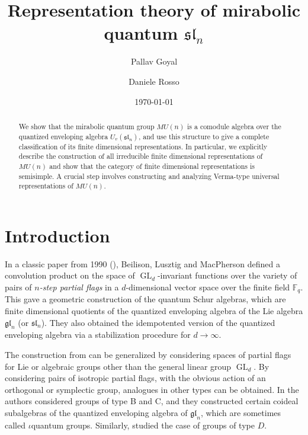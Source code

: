 \documentclass{amsart}
\title{Representation theory of mirabolic quantum $\mathfrak{sl}_n$}
\author{Pallav Goyal}
\author{Daniele Rosso}
\date{\today}
\numberwithin{equation}{section}
\theoremstyle{theorem}
\theoremstyle{definition}
\newcommand{\FF}{\mathbb{F}}
\newcommand{\gl}{\mathfrak{gl}}
\newcommand{\sll}{\mathfrak{sl}}
\newcommand{\GL}{\operatorname{GL}}
\begin{document}
\begin{abstract}
We show that the mirabolic quantum group $MU(n)$ is a comodule algebra over the quantized enveloping algebra $U_v(\mathfrak{sl}_n)$, and use this structure to give a complete classification of its finite dimensional representations. In particular, we explicitly describe the construction of all irreducible finite dimensional representations of $MU(n)$ and show that the category of finite dimensional representations is semisimple. A crucial step involves constructing and analyzing Verma-type universal representations of $MU(n)$.
\end{abstract}

\maketitle

\section{Introduction}

In a classic paper from 1990 (\cite{BLM}), Beilison, Lusztig and MacPherson defined a convolution product on the space of $\GL_d$-invariant functions over the variety of pairs of \emph{$n$-step partial flags} in a $d$-dimensional vector space over the finite field $\FF_q$. This gave a geometric construction of the quantum Schur algebras, which are finite dimensional quotients of the quantized enveloping algebra of the Lie algebra $\gl_n$ (or $\sll_n$). They also obtained the idempotented version of the quantized enveloping algebra via a stabilization procedure for $d\to\infty$.

The construction from \cite{BLM} can be generalized by considering spaces of partial flags for Lie or algebraic groups other than the general linear group $\GL_d$. By considering pairs of isotropic partial flags, with the obvious action of an orthogonal or symplectic group, analogues in other types can be obtained. In \cite{BKLW} the authors considered groups of type B and C, and they constructed certain coideal subalgebras of the quantized enveloping algebra of $\gl_n$, which are sometimes called $\iota$quantum groups. Similarly, \cite{FL15} studied the case of groups of type $D$.
\end{document}

